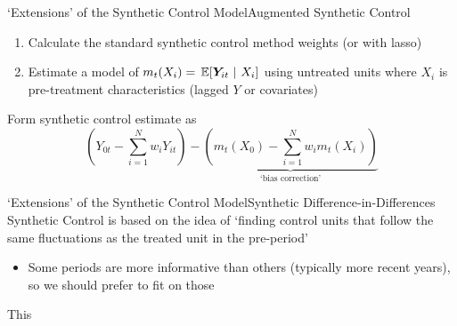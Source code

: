 \documentclass[t]{beamer}
\begin{document}
\begin{frame}{`Extensions' of the Synthetic Control Model}{Augmented Synthetic Control}
  \begin{enumerate}
    \item Calculate the standard synthetic control method weights (or with lasso)
    \item Estimate a model of $m_{t}(X_i) = \expec{\bm{Y}_{it}}{X_i}$ using untreated units where $X_i$ is pre-treatment characteristics (lagged $Y$ or covariates)
  \end{enumerate}

  \bigskip
  Form synthetic control estimate as 
  $$
    \left( Y_{0t} - \sum_{i = 1}^N w_i Y_{it} \right) -
      \underbrace{\left( m_{t}(X_0) - \sum_{i = 1}^N w_i m_t(X_i) \right)}_{\text{`bias correction'}}
  $$
\end{frame}



\begin{frame}{`Extensions' of the Synthetic Control Model}{Synthetic Difference-in-Differences}
  Synthetic Control is based on the idea of `finding control units that follow the same fluctuations as the treated unit in the pre-period'
  \begin{itemize}
    \item Some periods are more informative than others (typically more recent years), so we should prefer to fit on those
  \end{itemize}

  This 
\end{frame}
\end{document}
